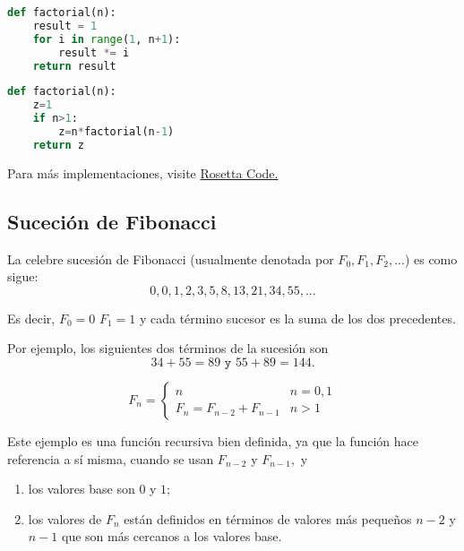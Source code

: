 \begin{lstlisting}[language=python, caption=Implementación iterativa del \emph{factorial} en \texttt{Python}]
def factorial(n):
	result = 1
	for i in range(1, n+1):
		result *= i
	return result
\end{lstlisting}

\begin{lstlisting}[language=python, caption=Implementación recursiva del \emph{factorial} en \texttt{Python}]
def factorial(n):
	z=1
	if n>1:
		z=n*factorial(n-1)
	return z
\end{lstlisting}

Para más implementaciones, visite \href{https://rosettacode.org/wiki/Factorial}{Rosetta Code.}



\subsection{Suceción de Fibonacci}


	La celebre sucesión de Fibonacci (usualmente denotada por $F_{0}, F_{1}, F_{2},...$) es como sigue:
	$$
	0,0,1,2,3,5,8,13,21,34,55,...
	$$

	Es decir, $F_{0}=0$  $F_{1}=1$ y cada t\'ermino sucesor es la suma de los dos precedentes.



	Por ejemplo, los siguientes dos t\'erminos de la sucesión son
	$$34+55=89 \texttt{ y }55+89=144.$$



	\begin{definicion}
		$$
		F_{n}=
		\begin{cases}
			n & n=0,1 \\
			F_{n}=F_{n-2}+F_{n-1} & n>1
		\end{cases}
		$$
	\end{definicion}



	Este ejemplo es una función recursiva bien definida, ya que la función hace referencia a sí misma, cuando se usan $ F_{n-2}$ y $F_{n-1},$ y
	\begin{enumerate}
		\item los valores base son $0$ y $1;$
		\item los valores de $F_{n}$ están definidos en t\'erminos de valores más peque\~nos $n-2$ y $n-1$ que son más cercanos a los valores base.
	\end{enumerate}



